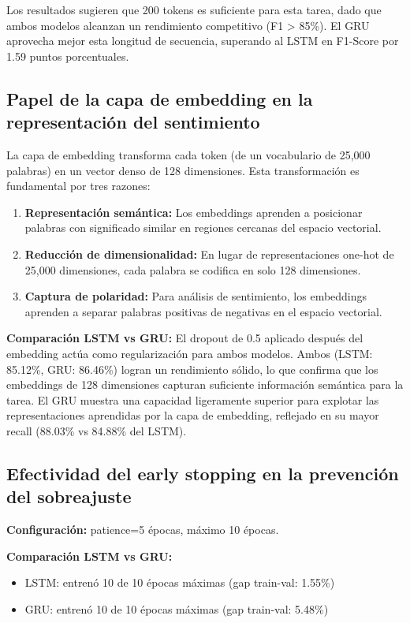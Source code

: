 Los resultados sugieren que 200 tokens es suficiente para esta tarea, dado que ambos modelos alcanzan un rendimiento competitivo (F1 > 85\%). El GRU aprovecha mejor esta longitud de secuencia, superando al LSTM en F1-Score por 1.59 puntos porcentuales.

\subsection{Papel de la capa de embedding en la representación del sentimiento}

La capa de embedding transforma cada token (de un vocabulario de 25,000 palabras) en un vector denso de 128 dimensiones. Esta transformación es fundamental por tres razones:

\begin{enumerate}
    \item \textbf{Representación semántica:} Los embeddings aprenden a posicionar palabras con significado similar en regiones cercanas del espacio vectorial.
    \item \textbf{Reducción de dimensionalidad:} En lugar de representaciones one-hot de 25,000 dimensiones, cada palabra se codifica en solo 128 dimensiones.
    \item \textbf{Captura de polaridad:} Para análisis de sentimiento, los embeddings aprenden a separar palabras positivas de negativas en el espacio vectorial.
\end{enumerate}

\textbf{Comparación LSTM vs GRU:} El dropout de 0.5 aplicado después del embedding actúa como regularización para ambos modelos. Ambos (LSTM: 85.12\%, GRU: 86.46\%) logran un rendimiento sólido, lo que confirma que los embeddings de 128 dimensiones capturan suficiente información semántica para la tarea. El GRU muestra una capacidad ligeramente superior para explotar las representaciones aprendidas por la capa de embedding, reflejado en su mayor recall (88.03\% vs 84.88\% del LSTM).

\subsection{Efectividad del early stopping en la prevención del sobreajuste}

\textbf{Configuración:} patience=5 épocas, máximo 10 épocas.

\textbf{Comparación LSTM vs GRU:}
\begin{itemize}
    \item LSTM: entrenó 10 de 10 épocas máximas (gap train-val: 1.55\%)
    \item GRU: entrenó 10 de 10 épocas máximas (gap train-val: 5.48\%)
\end{itemize}

